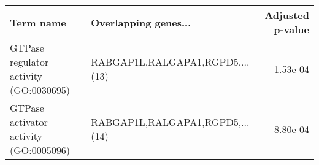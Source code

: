 \begin{tabular}{llr}
\toprule
                             Term name &            Overlapping genes... &  Adjusted p-value \\
\midrule
GTPase regulator activity (GO:0030695) & RABGAP1L,RALGAPA1,RGPD5,...(13) &          1.53e-04 \\
GTPase activator activity (GO:0005096) & RABGAP1L,RALGAPA1,RGPD5,...(14) &          8.80e-04 \\
\bottomrule
\end{tabular}
